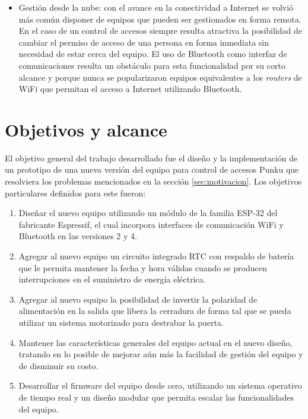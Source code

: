 \begin{itemize}
	\item Gestión desde la nube: con el avance en la conectividad a Internet se volvió más común disponer de equipos que pueden ser gestionados en forma remota. En el caso de un control de accesos siempre resulta atractiva la posibilidad de cambiar el permiso de acceso de una persona en forma inmediata sin necesidad de estar cerca del equipo. El uso de Bluetooth como interfaz de comunicaciones resulta un obstáculo para esta funcionalidad por su corto alcance y porque nunca se popularizaron equipos equivalentes a los \emph{routers} de WiFi que permitan el acceso a Internet utilizando Bluetooth.
\end{itemize}

\section{Objetivos y alcance}
\label{sec:objetivos}

El objetivo general del trabajo desarrollado fue el diseño y la implementación de un prototipo de una nueva versión del equipo para control de accesos Punku que resolviera los problemas mencionados en la sección \ref{sec:motivacion}. Los objetivos particulares definidos para este fueron:

\begin{enumerate}
	\item Diseñar el nuevo equipo utilizando un módulo de la familia ESP-32 del fabricante Espressif, el cual incorpora interfaces de comunicación WiFi y Bluetooth en las versiones 2 y 4.
	
	\item Agregar al nuevo equipo un circuito integrado RTC con respaldo de batería que le permita mantener la fecha y hora válidas cuando se producen interrupciones en el suministro de energía eléctrica.
	
	\item Agregar al nuevo equipo la posibilidad de invertir la polaridad de alimentación en la salida que libera la cerradura de forma tal que se pueda utilizar un sistema motorizado para destrabar la puerta.
	
	\item Mantener las características generales del equipo actual en el nuevo diseño, tratando en lo posible de mejorar aún más la facilidad de gestión del equipo y de disminuir su costo.
	
	\item Desarrollar el firmware del equipo desde cero, utilizando un sistema operativo de tiempo real y un diseño modular que permita escalar las funcionalidades del equipo.
\end{enumerate}

